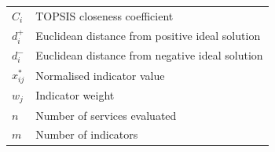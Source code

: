 \begin{tabular}{ll}
$C_i$           & TOPSIS closeness coefficient \\
$d_i^+$         & Euclidean distance from positive ideal solution \\
$d_i^-$         & Euclidean distance from negative ideal solution \\
$x_{ij}^*$      & Normalised indicator value \\
$w_j$           & Indicator weight \\
$n$             & Number of services evaluated \\
$m$             & Number of indicators \\
\end{tabular}
